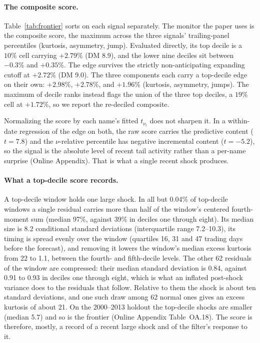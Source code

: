 \documentclass[11pt]{article}
\theoremstyle{remark}
\begin{document}
\paragraph{The composite score.} Table~\ref{tab:frontier} sorts on each
signal separately. The monitor the paper uses is the composite
score, the maximum across the three signals' trailing-panel
percentiles (kurtosis, asymmetry, jump). Evaluated directly, its top
decile is a $10\%$ cell carrying $+2.79\%$ (DM 8.9), and the lower nine
deciles sit between $-0.3\%$ and $+0.35\%$. The edge survives the
strictly non-anticipating expanding cutoff at $+2.72\%$ (DM 9.0). The three components each carry a top-decile edge on their own: $+2.98\%$, $+2.78\%$, and $+1.96\%$ (kurtosis, asymmetry, jumps). The maximum of decile ranks instead flags the union of the three top deciles, a $19\%$ cell at $+1.72\%$, so we report the re-deciled composite.

Normalizing the score by each name's fitted $t_{\nu_i}$ does not sharpen it. In a within-date regression of the edge on both, the raw score carries the predictive content ($t=7.8$) and the $\nu$-relative percentile has negative incremental content ($t=-5.2$), so the signal is the absolute level of recent tail activity rather than a per-name surprise (Online Appendix). That is what a single recent shock produces.

\paragraph{What a top-decile score records.} A top-decile window holds one large shock. In all but 0.04\% of top-decile windows a single residual carries more than half of the window's centered fourth-moment sum (median 97\%, against 39\% in deciles one through eight). Its median size is 8.2 conditional standard deviations (interquartile range 7.2--10.3), its timing is spread evenly over the window (quartiles 16, 31 and 47 trading days before the forecast), and removing it lowers the window's median excess kurtosis from 22 to 1.1, between the fourth- and fifth-decile levels. The other 62 residuals of the window are compressed: their median standard deviation is 0.84, against 0.91 to 0.93 in deciles one through eight, which is what an inflated post-shock variance does to the residuals that follow. Relative to them the shock is about ten standard deviations, and one such draw among 62 normal ones gives an excess kurtosis of about 21. On the 2000--2013 holdout the top-decile shocks are smaller (median 5.7) and so is the frontier (Online Appendix Table~OA.18). The score is therefore, mostly, a record of a recent large shock and of the filter's response to it.
\end{document}
